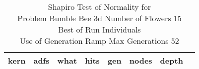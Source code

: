\begin{table}[H]
\caption{Shapiro Test of Normality for \\ Problem  Bumble Bee 3d  Number of Flowers 15\\Best of Run Individuals \\ Use of Generation Ramp  Max Generations 52\\}
\begin{center}
\scalebox{0.8} %
{
\begin{tabular}{lrrrrrrr}
\hline
kern & adfs & what & hits & gen & nodes & depth \\
\hline


\end{tabular}
}
\end{center}
\end{table}

